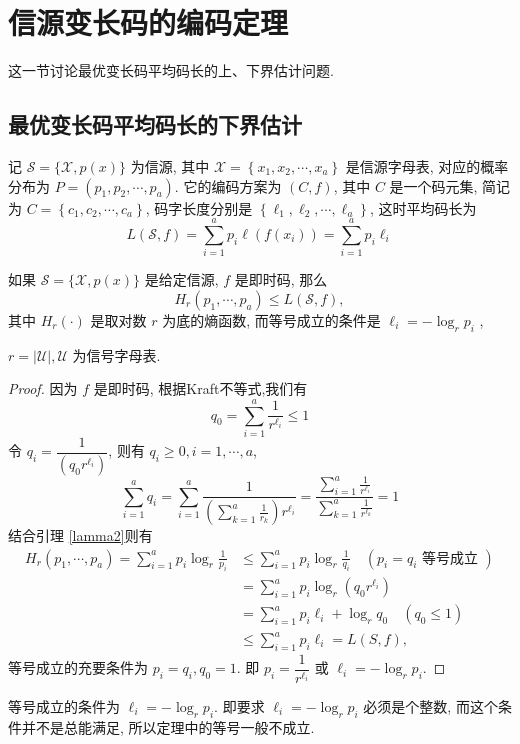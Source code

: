 
\section{信源变长码的编码定理}
这一节讨论最优变长码平均码长的上、下界估计问题.


\subsection{最优变长码平均码长的下界估计}
记 $ \mathscr{S}=\{\mathscr{X}, p(x)\} $ 为信源, 其中 $ \mathscr{X}=\left\{x_{1}, x_{2}, \cdots, x_{a}\right\} $ 是信源字母表, 对应的概率分布为 $ P=\left(p_{1}, p_{2}, \cdots, p_{a}\right) $. 它的编码方案为 $ (C, f) $, 其中 $ C $ 是一个码元集, 简记为 $ C=\left\{c_{1}, c_{2}, \cdots, c_{a}\right\} $, 码字长度分别是 $ \left\{\ell_{1}, \ell_{2}, \cdots, \ell_{a}\right\} $, 这时平均码长为
$$
L(\mathscr{S}, f)=\sum_{i=1}^{a} p_{i} \ell\left(f\left(x_{i}\right)\right)=\sum_{i=1}^{a} p_{i} \ell_{i}
$$

\begin{theorem}
    如果 $ \mathscr{S}=\{\mathscr{X}, p(x)\} $ 是给定信源, $ f $ 是即时码, 那么
$$
H_{r}\left(p_{1}, \cdots, p_{a}\right) \leqslant L(\mathscr{S}, f),
$$
其中 $ H_{r}(\cdot) $ 是取对数 $ r $ 为底的熵函数, 而等号成立的条件是 $ \ell_{i}=-\log _{r} p_{i}$ , 

$r=|\mathscr{U}|, \mathscr{U} $ 为信号字母表.
\end{theorem}
\begin{proof}
    因为 $ f $ 是即时码, 根据Kraft不等式,我们有
$$
q_{0}=\sum_{i=1}^{a} \frac{1}{r^{\ell_{i}}} \leq 1
$$
令 $ q_{i}=\dfrac{1}{\left(q_{0} r^{\ell_{i}}\right)} $, 则有 $ q_{i} \geq 0, i=1, \cdots, a $,
$$
\sum_{i=1}^{a} q_{i}=\sum_{i=1}^{a} \frac{1}{\left(\sum\limits_{k=1}^{a} \frac{1}{r_{k}}\right) r^{\ell_{i}}}=\frac{\sum\limits_{i=1}^{a} \frac{1}{r^{\ell_{i}}}}{\sum\limits_{k=1}^{a} \frac{1}{r^{\ell_{k}}}}=1
$$
结合引理 \ref{lamma2}则有 
$$
\begin{aligned}
H_{r}\left(p_{1}, \cdots, p_{a}\right)=\sum_{i=1}^{a} p_{i} \log _{r} \frac{1}{p_{i}}
&\leq \sum_{i=1}^{a} p_{i} \log _{r} \frac{1}{q_{i}} \quad\left(p_{i}=q_{i} \text { 等号成立 }\right) \\
&=\sum_{i=1}^{a} p_{i} \log _{r}\left(q_{0} r^{\ell_{i}}\right) \\
&=\sum_{i=1}^{a} p_{i} \ell_{i}+\log _{r} q_{0} \quad (q_{0} \leq 1) \\
&\leq \sum_{i=1}^{a} p_{i} \ell_{i}=L(S, f),
\end{aligned}
$$
等号成立的充要条件为 $ p_{i}=q_{i}, q_{0}=1 $. 即 $ p_{i}=\dfrac{1}{r^{\ell_{i}}} $ 或 $ \ell_{i}=-\log _{r} p_{i} $.
\end{proof}
\begin{remark}
    等号成立的条件为 $ \ell_{i}=-\log _{r} p_{i} $. 即要求 $ \ell_{i}=-\log _{r} p_{i} $ 必须是个整数, 而这个条件并不是总能满足, 所以定理中的等号一般不成立.
\end{remark}

